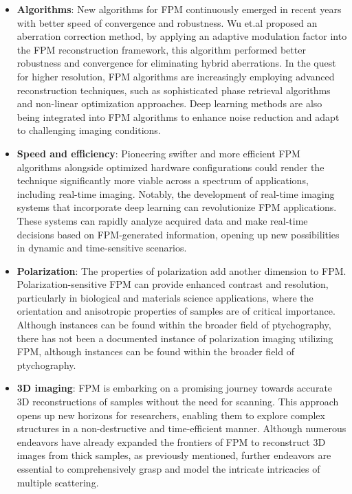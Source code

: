\documentclass[journal,review,submit,pdftex,moreauthors]{Definitions/mdpi}
\begin{document}
\begin{itemize}

     \item \textbf{Algorithms}: New algorithms for FPM continuously emerged in recent years with better speed of convergence and robustness. Wu et.al proposed an aberration correction method, by applying an adaptive modulation factor into the FPM reconstruction framework, this algorithm performed better robustness and convergence for eliminating hybrid aberrations\cite{wu2023adaptive}. In the quest for higher resolution, FPM algorithms are increasingly employing advanced reconstruction techniques, such as sophisticated phase retrieval algorithms and non-linear optimization approaches. Deep learning methods are also being integrated into FPM algorithms to enhance noise reduction and adapt to challenging imaging conditions.
     
    \item \textbf{Speed and efficiency}: Pioneering swifter and more efficient FPM algorithms alongside optimized hardware configurations could render the technique significantly more viable across a spectrum of applications, including real-time imaging. Notably, the development of real-time imaging systems that incorporate deep learning can revolutionize FPM applications. These systems can rapidly analyze acquired data and make real-time decisions based on FPM-generated information, opening up new possibilities in dynamic and time-sensitive scenarios.
    
    \item \textbf{Polarization}: The properties of polarization add another dimension to FPM. Polarization-sensitive FPM can provide enhanced contrast and resolution, particularly in biological and materials science applications, where the orientation and anisotropic properties of samples are of critical importance. Although instances can be found within the broader field of ptychography, there has not been a documented instance of polarization imaging utilizing FPM, although instances can be found within the broader field of ptychography.

      \item \textbf{3D imaging}: FPM is embarking on a promising journey towards accurate 3D reconstructions of samples without the need for scanning. This approach opens up new horizons for researchers, enabling them to explore complex structures in a non-destructive and time-efficient manner. Although numerous endeavors have already expanded the frontiers of FPM to reconstruct 3D images from thick samples, as previously mentioned, further endeavors are essential to comprehensively grasp and model the intricate intricacies of multiple scattering.



\end{itemize}
\end{document}
